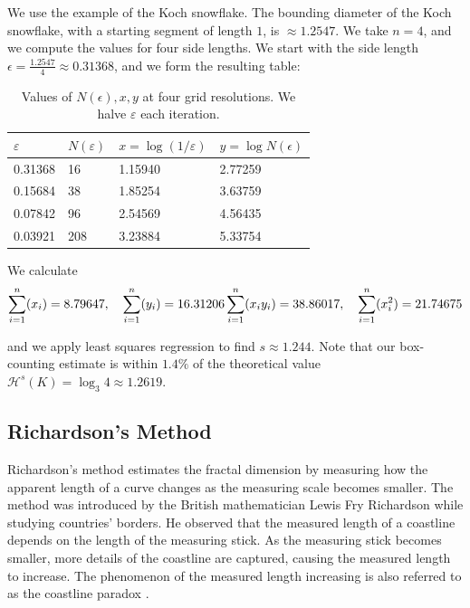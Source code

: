 \documentclass{article}
\begin{document}
We use the example of the Koch snowflake. The bounding diameter of the Koch snowflake, with a starting segment of length $1$, is $\approx 1.2547$. We take $n=4$, and we compute the values for four side lengths. We start with the side length $\epsilon = \frac{1.2547}{4} \approx 0.31368$, and we form the resulting table:

\begin{table}[h!]
\centering
\renewcommand{\arraystretch}{1.4}
\begin{tabular}{l|l|l|l}
$\varepsilon$ & $N(\varepsilon)$ & $x = \log (1/\varepsilon)$ & $y = \log N(\epsilon)$\\\hline
0.31368 & 16 & 1.15940 & 2.77259 \\
0.15684 & 38 & 1.85254 & 3.63759 \\
0.07842 & 96 & 2.54569 & 4.56435 \\
0.03921 & 208 & 3.23884 & 5.33754
\end{tabular}
\caption{\label{tab:widgets}\centering Values of $N(\epsilon), x, y$ at four grid resolutions. We halve $\varepsilon$ each iteration.}
\end{table}

We calculate 
$$\sum_{i=1}^{n} (x_i) = 8.79647, \quad \sum_{i=1}^{n} (y_i) = 16.31206 \\
\sum_{i=1}^{n} (x_iy_i) = 38.86017, \quad \sum_{i=1}^{n} (x_i^2) = 21.74675$$

and we apply least squares regression to find $s \approx 1.244$. Note that our box-counting estimate is within $1.4 \%$ of the theoretical value $\mathcal{H}^{s}(K) = \log_3 4 \approx 1.2619$.

\subsection{Richardson's Method}

Richardson's method estimates the fractal dimension by measuring how the apparent length of a curve changes as the measuring scale becomes smaller. The method was introduced by the British mathematician Lewis Fry Richardson while studying countries' borders. He observed that the measured length of a coastline depends on the length of the measuring stick. As the measuring stick becomes smaller, more details of the coastline are  captured, causing the measured length to increase. The phenomenon of the measured length increasing is also referred to as the coastline paradox \cite{weisstein_coastlineparadox}. \\
\end{document}
